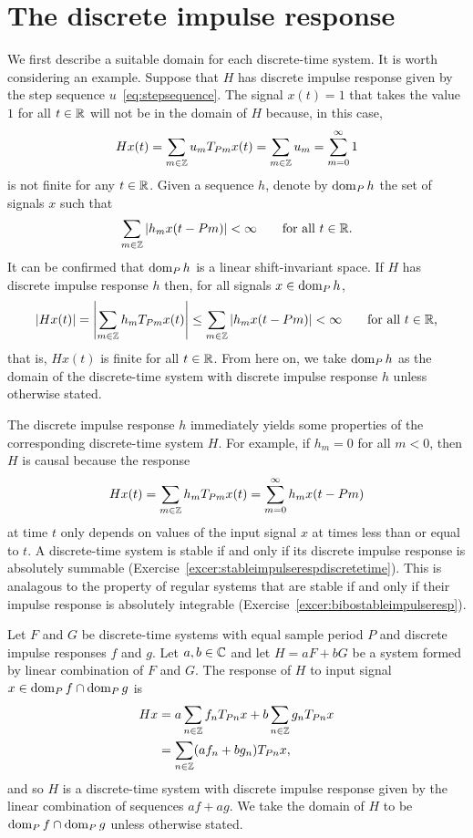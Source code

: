 \section{The discrete impulse response} \label{sec:discr-time-impulse}

We first describe a suitable domain for each discrete-time system.  It is worth considering an example.  Suppose that $H$ has discrete impulse response given by the step sequence $u$~\eqref{eq:stepsequence}.  The signal $x(t) = 1$ that takes the value $1$ for all $t \in {\mathbb R}$ will not be in the domain of $H$ because, in this case,
\[
Hx(t) =  \sum_{m \in {\mathbb Z}} u_m T_{ P m} x(t) = \sum_{m \in {\mathbb Z}} u_m = \sum_{m=0}^\infty 1
\]
is not finite for any $t \in {\mathbb R}$.  Given a sequence $h$, denote by $\operatorname{dom}_P h$ the set of signals $x$ such that
\[
\sum_{m \in {\mathbb Z}} \left\vert h_m x(t - Pm) \right\vert < \infty \qquad \text{for all $t \in {\mathbb R}$}.
\]
It can be confirmed that $\operatorname{dom}_P h$ is a linear shift-invariant space.  If $H$ has discrete impulse response $h$ then, for all signals $x \in \operatorname{dom}_P h$,
\[
\left\vert Hx(t) \right\vert = \left\vert \sum_{m \in {\mathbb Z}} h_m T_{ P m} x(t) \right\vert \leq \sum_{m \in {\mathbb Z}}  \left\vert  h_m x(t - Pm) \right\vert < \infty \qquad \text{for all $t \in {\mathbb R}$,}
\]
that is, $Hx(t)$ is finite for all $t \in {\mathbb R}$.  From here on, we take $\operatorname{dom}_P h$ as the domain of the discrete-time system with discrete impulse response $h$ unless otherwise stated.  %

The discrete impulse response $h$ immediately yields some properties of the corresponding discrete-time system $H$.  For example, if $h_m = 0$ for all $m < 0$, then $H$ is causal because the response 
\[
Hx(t) = \sum_{m \in {\mathbb Z}} h_m T_{ P m}x(t) = \sum_{m =0}^\infty h_m x(t - Pm)
\] 
at time $t$ only depends on values of the input signal $x$ at times less than or equal to $t$.  A discrete-time system is stable if and only if its discrete impulse response is absolutely summable (Exercise~\ref{excer:stableimpulserespdiscretetime}).  This is analagous to the property of regular systems that are stable if and only if their impulse response is absolutely integrable (Exercise~\ref{excer:bibostableimpulseresp}).

Let $F$ and $G$ be discrete-time systems with equal sample period $P$ and discrete impulse responses $f$ and $g$.  Let $a,b\in{\mathbb C}$ and let $H = a F + b G$ be a system formed by linear combination of $F$ and $G$.  The response of $H$ to input signal $x \in \operatorname{dom}_P f \cap \operatorname{dom}_P g$ is
\begin{align*}
Hx &= a \sum_{n \in {\mathbb Z}} f_{n} T_{ P n}x + b \sum_{n \in {\mathbb Z}} g_{n} T_{ P n}x \\
&=  \sum_{n \in {\mathbb Z}} (a f_{n} + b g_{n}) T_{ P n}x,
\end{align*}
and so $H$ is a discrete-time system with discrete impulse response given by the linear combination of sequences $af + ag$.  We take the domain of $H$ to be $\operatorname{dom}_P f \cap \operatorname{dom}_P g$ unless otherwise stated.

